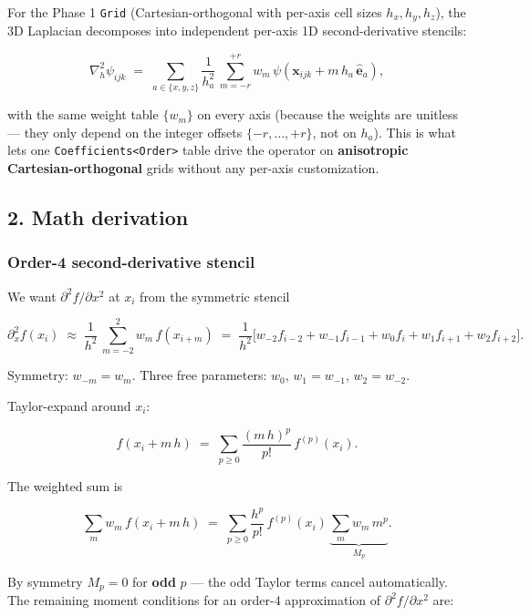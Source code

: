 For the Phase 1 \passthrough{\lstinline!Grid!} (Cartesian-orthogonal
with per-axis cell sizes \(h_x, h_y, h_z\)), the 3D Laplacian decomposes
into independent per-axis 1D second-derivative stencils:

\[
\nabla^2_h \psi_{ijk} \;=\; \sum_{a \in \{x,y,z\}} \frac{1}{h_a^2}\,\sum_{m=-r}^{+r} w_m\,\psi(\mathbf{x}_{ijk} + m\,h_a\,\hat{\mathbf{e}}_a),
\]

with the same weight table \(\{w_m\}\) on every axis (because the
weights are unitless --- they only depend on the integer offsets
\(\{-r, \ldots, +r\}\), not on \(h_a\)). This is what lets one
\passthrough{\lstinline!Coefficients<Order>!} table drive the operator
on \textbf{anisotropic Cartesian-orthogonal} grids without any per-axis
customization.

\subsection{2. Math derivation}\label{math-derivation}

\subsubsection{Order-4 second-derivative
stencil}\label{order-4-second-derivative-stencil}

We want \(\partial^2 f / \partial x^2\) at \(x_i\) from the symmetric
stencil

\[
\partial^2_x f(x_i) \;\approx\; \frac{1}{h^2}\,\sum_{m=-2}^{2} w_m\,f(x_{i+m})
\;=\; \frac{1}{h^2}\bigl[w_{-2} f_{i-2} + w_{-1} f_{i-1} + w_0 f_i + w_1 f_{i+1} + w_2 f_{i+2}\bigr].
\]

Symmetry: \(w_{-m} = w_m\). Three free parameters: \(w_0\),
\(w_1 = w_{-1}\), \(w_2 = w_{-2}\).

Taylor-expand around \(x_i\):

\[
f(x_i + m\,h) \;=\; \sum_{p \ge 0} \frac{(m\,h)^p}{p!}\,f^{(p)}(x_i).
\]

The weighted sum is

\[
\sum_m w_m\,f(x_i + m\,h) \;=\; \sum_{p \ge 0} \frac{h^p}{p!}\,f^{(p)}(x_i)\,\underbrace{\sum_m w_m\,m^p}_{\,M_p\,}.
\]

By symmetry \(M_p = 0\) for \textbf{odd} \(p\) --- the odd Taylor terms
cancel automatically. The remaining moment conditions for an order-4
approximation of \(\partial^2 f / \partial x^2\) are:

